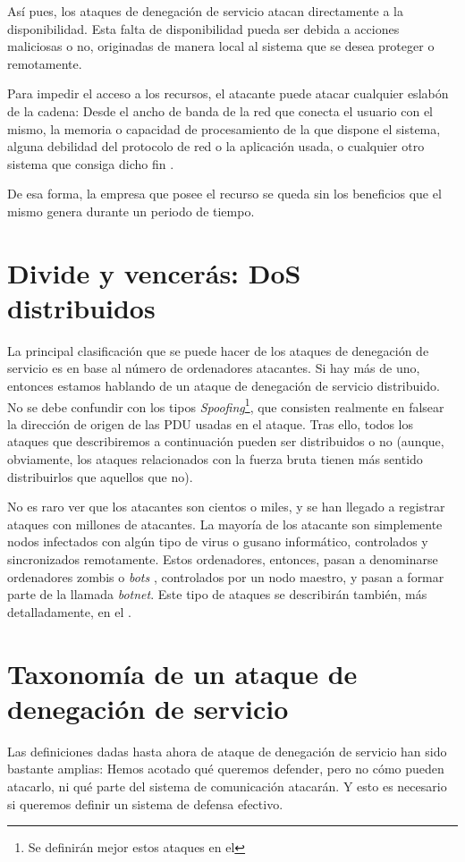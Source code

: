 Así pues, los ataques de denegación de servicio atacan directamente a la disponibilidad. Esta falta de disponibilidad 
pueda ser debida a acciones maliciosas o no, originadas de manera local al sistema que se desea proteger o remotamente.

Para impedir el acceso a los recursos, el atacante puede atacar cualquier eslabón de la cadena: Desde el ancho de banda 
de la red que conecta el usuario con el mismo, la memoria o capacidad de procesamiento de la que dispone el sistema, 
alguna debilidad del protocolo de red o la aplicación usada, o cualquier otro sistema que consiga dicho fin 
\cite{Raghavan}.

De esa forma, la empresa que posee el recurso se queda sin los beneficios que el mismo genera durante un periodo de 
tiempo. 

\section{Divide y vencerás: DoS distribuidos}
La principal clasificación que se puede hacer de los ataques de denegación de servicio es en base al número de 
ordenadores atacantes. Si hay más de uno, entonces estamos hablando de un ataque de denegación de servicio distribuido. 
No se debe confundir con los tipos \emph{Spoofing}\footnote{Se definirán mejor estos ataques en el 
}, que consisten realmente en falsear la dirección de origen de 
las PDU usadas en el ataque. Tras ello, todos los ataques que describiremos a continuación pueden ser distribuidos o no 
(aunque, obviamente, los ataques relacionados con la fuerza bruta tienen más sentido distribuirlos que aquellos que no).

No es raro ver que los atacantes son cientos o miles, y se han llegado a registrar ataques con millones de atacantes. 
La mayoría de los atacante son simplemente nodos infectados con algún tipo de virus o gusano informático, controlados 
y sincronizados remotamente. Estos ordenadores, entonces, pasan a denominarse ordenadores zombis o \emph{bots} 
 , controlados por un nodo maestro, y pasan a formar parte de la llamada 
\emph{botnet}. Este tipo de ataques se describirán también, más detalladamente, en el .

\section{Taxonomía de un ataque de denegación de servicio}
Las definiciones dadas hasta ahora de ataque de denegación de servicio han sido bastante amplias: Hemos acotado qué 
queremos defender, pero no cómo pueden atacarlo, ni qué parte del sistema de comunicación atacarán. Y esto es necesario 
si queremos definir un sistema de defensa efectivo.

